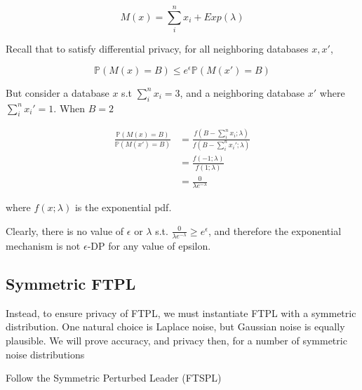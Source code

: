 
\begin{equation}
    M(x) = \sum_{i}^n x_i + Exp(\lambda)
\end{equation}

Recall that to satisfy differential privacy, for all neighboring databases $x, x'$,

\begin{equation}
\mathbb{P}(M(x) = B) \leq e^\epsilon \mathbb{P}(M(x') = B) 
\end{equation}

But consider a database $x$ s.t $\sum_{i}^n x_i = 3$, and a neighboring database $x'$ where $\sum_{i}^n x_i' = 1$. When $B = 2$

\begin{align}
    \frac{\mathbb{P}(M(x) = B)}{\mathbb{P}(M(x') = B)} &= \frac{f(B - \sum_{i}^n x_i; \lambda)}{f(B - \sum_{i}^n x_i'; \lambda)} \\
    &= \frac{f(-1; \lambda)}{f(1; \lambda)} \\
    &= \frac{0}{\lambda e^{-\lambda}}
\end{align}

where $f(x;\lambda)$ is the exponential pdf. 

Clearly, there is no value of $\epsilon$ or $\lambda$ s.t. $\frac{0}{\lambda e^{-\lambda}} \geq e^\epsilon$, and therefore the exponential mechanism is not $\epsilon$-DP for any value of epsilon. 

\subsection{Symmetric FTPL}

Instead, to ensure privacy of FTPL, we must instantiate FTPL with a symmetric distribution. One natural choice is Laplace noise, but Gaussian noise is equally plausible. We will prove accuracy, and privacy then, for a number of symmetric noise distributions

\begin{algorithm}[H]
    \caption {Follow the Symmetric Perturbed Leader (FTSPL)}
    ~\\
\end{algorithm}

